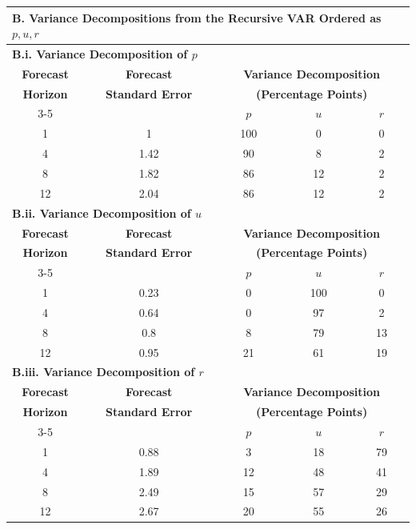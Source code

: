 \begin{table}[!htbp]
\begin{tabular}{ccccc}
\multicolumn{5}{l}{\textbf{B. Variance Decompositions from the Recursive VAR Ordered as $p,u,r$}} \\
\hline
\multicolumn{5}{l}{\textbf{B.i. Variance Decomposition of $p$}} \\
\hline
\textbf{Forecast} & \textbf{Forecast} & \multicolumn{3}{c}{\textbf{Variance Decomposition}} \\
\textbf{Horizon} & \textbf{Standard Error} & \multicolumn{3}{c}{\textbf{(Percentage Points)}} \\
\cline{3-5}
 & & $p$ & $u$ & $r$ \\
\hline
1 & 1 & 100 & 0 & 0 \\
4 & 1.42 & 90 & 8 & 2 \\
8 & 1.82 & 86 & 12 & 2 \\
12 & 2.04 & 86 & 12 & 2 \\
\hline
\multicolumn{5}{l}{\textbf{B.ii. Variance Decomposition of $u$}} \\
\hline
\textbf{Forecast} & \textbf{Forecast} & \multicolumn{3}{c}{\textbf{Variance Decomposition}} \\
\textbf{Horizon} & \textbf{Standard Error} & \multicolumn{3}{c}{\textbf{(Percentage Points)}} \\
\cline{3-5}
 & & $p$ & $u$ & $r$ \\
\hline
1 & 0.23 & 0 & 100 & 0 \\
4 & 0.64 & 0 & 97 & 2 \\
8 & 0.8 & 8 & 79 & 13 \\
12 & 0.95 & 21 & 61 & 19 \\
\hline
\multicolumn{5}{l}{\textbf{B.iii. Variance Decomposition of $r$}} \\
\hline
\textbf{Forecast} & \textbf{Forecast} & \multicolumn{3}{c}{\textbf{Variance Decomposition}} \\
\textbf{Horizon} & \textbf{Standard Error} & \multicolumn{3}{c}{\textbf{(Percentage Points)}} \\
\cline{3-5}
 & & $p$ & $u$ & $r$ \\
\hline
1 & 0.88 & 3 & 18 & 79 \\
4 & 1.89 & 12 & 48 & 41 \\
8 & 2.49 & 15 & 57 & 29 \\
12 & 2.67 & 20 & 55 & 26 \\
\hline
\end{tabular}

\end{table}
